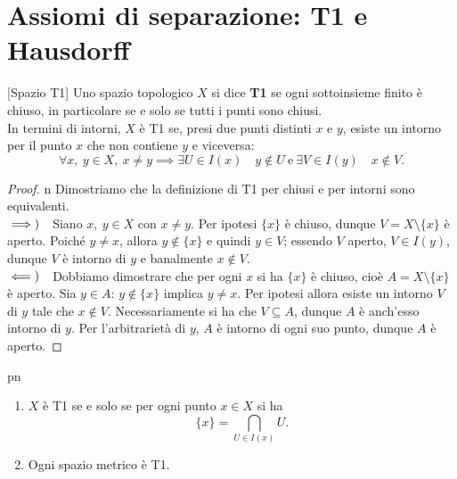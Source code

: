 \section{Assiomi di separazione: T1 e Hausdorff}
\begin{definition}{}[Spazio T1]\label{T1}
Uno spazio topologico $X$ si dice \textbf{T1} se ogni sottoinsieme finito è chiuso, in particolare se e solo se tutti i punti sono chiusi.\\
In termini di intorni, $X$ è T1 se, presi due punti distinti $x$ e $y$, esiste un intorno per il punto $x$ che non contiene $y$ e viceversa:
\begin{equation*}
\forall x,\ y\in X,\ x\neq y\implies \exists U\in I\left(x\right)\quad y\notin U\ \text{e}\ \exists V\in I\left(y\right)\quad x\notin V.
\end{equation*}
\end{definition}
\begin{proof}{n}
Dimostriamo che la definizione di T1 per chiusi e per intorni sono equivalenti.\\
$\implies)\quad$Siano $x,\ y\in X$ con $x\neq y$. Per ipotesi $\{x\}$ è chiuso, dunque $V=X\setminus\{x\}$ è aperto. Poiché $y\neq x$, allora $y\notin\{x\}$ e quindi $y\in V$; essendo $V$ aperto, $V\in I\left(y\right)$, dunque $V$ è intorno di $y$ e banalmente $x\notin V$.\\
$\impliedby)\quad$Dobbiamo dimostrare che per ogni $x$ si ha $\{x\}$ è chiuso, cioè $A=X\setminus\{x\}$ è aperto. Sia $y\in A$: $y\notin \{x\}$ implica $y\neq x$. Per ipotesi allora esiste un intorno $V$ di $y$ tale che $x\notin V$. Necessariamente si ha che $V\subseteq A$, dunque $A$ è anch'esso intorno di $y$. Per l'arbitrarietà di $y$, $A$ è intorno di ogni suo punto, dunque $A$ è aperto.\qedhere
\end{proof}
\begin{remark}{pn}~{}
\begin{enumerate}
\item $X$ è T1 se e solo se per ogni punto $x\in X$ si ha
\begin{equation*}
\{x\}=\bigcap_{U\in I\left(x\right)}U.
\end{equation*}
\item Ogni spazio metrico è T1.
\end{enumerate}
\end{remark}
